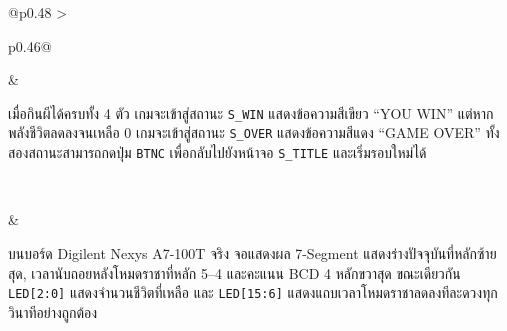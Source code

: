 \begin{longtable}{@{}p{0.48\textwidth} >{\raggedright\arraybackslash}p{0.46\textwidth}@{}}
    \begin{minipage}[t]{\linewidth}
        \vspace{0pt}\centering
    \end{minipage}
    &
    \begin{minipage}[t]{\linewidth}
        \vspace{0pt}\raggedright
        เมื่อกินผีได้ครบทั้ง 4 ตัว เกมจะเข้าสู่สถานะ \texttt{S\_WIN} แสดงข้อความสีเขียว “YOU WIN” แต่หากพลังชีวิตลดลงจนเหลือ 0 เกมจะเข้าสู่สถานะ \texttt{S\_OVER} แสดงข้อความสีแดง “GAME OVER” ทั้งสองสถานะสามารถกดปุ่ม \texttt{BTNC} เพื่อกลับไปยังหน้าจอ \texttt{S\_TITLE} และเริ่มรอบใหม่ได้
    \end{minipage} \\
    \midrule

    \begin{minipage}[t]{\linewidth}
        \vspace{0pt}\centering
    \end{minipage}
    &
    \begin{minipage}[t]{\linewidth}
        \vspace{0pt}\raggedright
        บนบอร์ด Digilent Nexys A7-100T จริง จอแสดงผล 7-Segment แสดงร่างปัจจุบันที่หลักซ้ายสุด, เวลานับถอยหลังโหมดราชาที่หลัก 5--4 และคะแนน BCD 4 หลักขวาสุด ขณะเดียวกัน \texttt{LED[2:0]} แสดงจำนวนชีวิตที่เหลือ และ \texttt{LED[15:6]} แสดงแถบเวลาโหมดราชาลดลงทีละดวงทุกวินาทีอย่างถูกต้อง
    \end{minipage} \\
\end{longtable}
